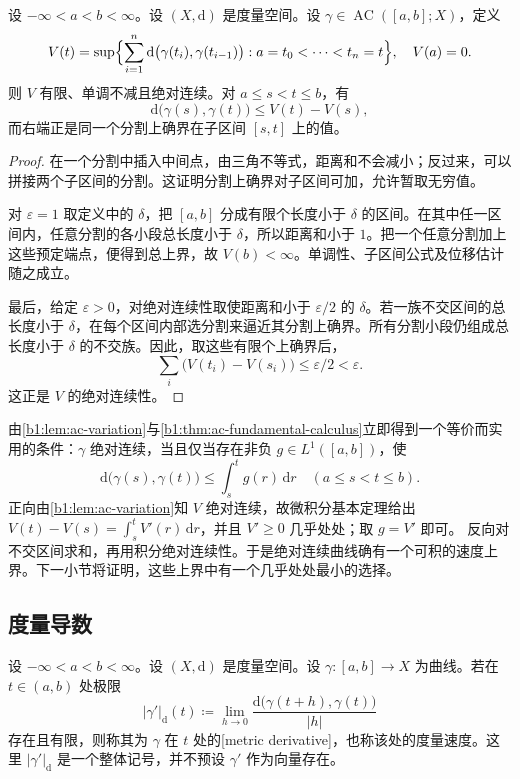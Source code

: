 \begin{lemma}
\label{b1:lem:ac-variation}
设 \(-\infty<a<b<\infty\)。设 \((X,\mathrm d)\) 是度量空间。设 \(\gamma\in\operatorname{AC}([a,b];X)\)，定义
\[
V(t)=\sup\Bigl\{\sum_{i=1}^n \mathrm{d}\bigl(\gamma(t_i),\gamma(t_{i-1})\bigr):
a=t_0<\cdots<t_n=t\Bigr\},
\quad V(a)=0.
\]
则 \(V\) 有限、单调不减且绝对连续。对 \(a\leq s<t\leq b\)，有
\[
\mathrm{d}\bigl(\gamma(s),\gamma(t)\bigr)\leq V(t)-V(s),
\]
而右端正是同一个分割上确界在子区间 \([s,t]\) 上的值。
\end{lemma}
\begin{proof}
在一个分割中插入中间点，由三角不等式，距离和不会减小；反过来，可以拼接两个子区间的分割。这证明分割上确界对子区间可加，允许暂取无穷值。

对 \(\varepsilon=1\) 取定义中的 \(\delta\)，把 \([a,b]\) 分成有限个长度小于 \(\delta\) 的区间。在其中任一区间内，任意分割的各小段总长度小于 \(\delta\)，所以距离和小于 \(1\)。把一个任意分割加上这些预定端点，便得到总上界，故 \(V(b)<\infty\)。单调性、子区间公式及位移估计随之成立。

最后，给定 \(\varepsilon>0\)，对绝对连续性取使距离和小于 \(\varepsilon/2\) 的 \(\delta\)。若一族不交区间的总长度小于 \(\delta\)，在每个区间内部选分割来逼近其分割上确界。所有分割小段仍组成总长度小于 \(\delta\) 的不交族。因此，取这些有限个上确界后，
\[
\sum_i\bigl(V(t_i)-V(s_i)\bigr)\leq\varepsilon/2<\varepsilon.
\]
这正是 \(V\) 的绝对连续性。
\end{proof}

由\cref{b1:lem:ac-variation}与\cref{b1:thm:ac-fundamental-calculus}立即得到一个等价而实用的条件：\(\gamma\) 绝对连续，当且仅当存在非负 \(g\in L^1([a,b])\)，使
\[
\mathrm{d}\bigl(\gamma(s),\gamma(t)\bigr)
\leq\int_s^t g(r)\,\mathrm dr
\quad(a\leq s<t\leq b).
\]
正向由\cref{b1:lem:ac-variation}知 \(V\) 绝对连续，故微积分基本定理给出
\(V(t)-V(s)=\int_s^tV'(r)\,\mathrm dr\)，并且 \(V'\geq0\) 几乎处处；取 \(g=V'\) 即可。
反向对不交区间求和，再用积分绝对连续性。于是绝对连续曲线确有一个可积的速度上界。下一小节将证明，这些上界中有一个几乎处处最小的选择。

\subsection{度量导数}
\label{b1:subsec:160502}

\begin{definition}
\label{b1:def:metric-derivative}
设 \(-\infty<a<b<\infty\)。设 \((X,\mathrm d)\) 是度量空间。设 \(\gamma:[a,b]\to X\) 为曲线。若在 \(t\in(a,b)\) 处极限
\[
|\gamma'|_{\mathrm d}(t)
\coloneqq\lim_{h\to0}\frac{\mathrm{d}\bigl(\gamma(t+h),\gamma(t)\bigr)}{|h|}
\]
存在且有限，则称其为 \(\gamma\) 在 \(t\) 处的[metric derivative]，也称该处的度量速度。这里 \(|\gamma'|_{\mathrm d}\) 是一个整体记号，并不预设 \(\gamma'\) 作为向量存在。
\end{definition}

